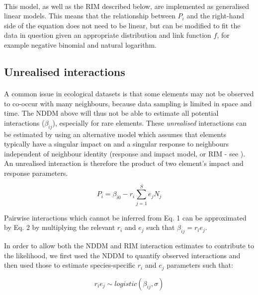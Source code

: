 \documentclass[a4,12pt]{article}
\begin{document}
        \paragraph{}
        This model, as well as the RIM described below, are implemented as generalised linear models. This means that the relationship between $P_i$ and the right-hand side of the equation does not need to be linear, but can be modified to fit the data in question given an appropriate distribution and link function $f$, for example negative binomial and natural logarithm. 
              
    \subsection{Unrealised interactions}

    \paragraph{}
       A common issue in ecological datasets is that some elements may not be observed to co-occur with many neighbours, because data sampling is limited in space and time. The NDDM above will thus not be able to estimate all potential interactions ($\beta_{ij}$), especially for rare elements. These \textit{unrealised} interactions can be estimated by using an alternative model which assumes that elements typically have a singular impact on and a singular response to neighbours independent of neighbour identity (response and impact model, or RIM - see \cite{Godoy2014b}). An unrealised interaction is therefore the product of two element's impact and response parameters. 

        \begin{equation}
        P_{i} = \beta_{i0} - r_{i} \sum_{j=1}^{S} e_{j} N_{j}
        \label{rim}
        \end{equation}
        
        Pairwise interactions which cannot be inferred from Eq. 1 can be approximated by Eq. 2 by multiplying the relevant $r_{i}$ and $e_{j}$ such that $\beta_{ij} = r_{i} e_{j}$. 

        In order to allow both the NDDM and RIM interaction estimates to contribute to the likelihood, we first used the NDDM to quantify observed interactions and then used those to estimate species-specific $r_i$ and $e_j$ parameters such that: 
    
        \begin{equation}
        r_i e_j \sim logistic \left ( \beta_{ij}, \sigma \right )
        \label{unrealised}
        \end{equation}
    
\end{document}
